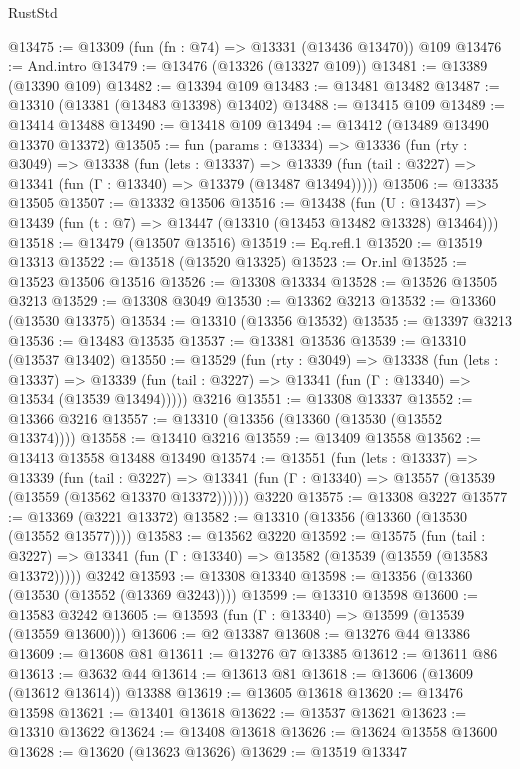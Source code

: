 \begin{lexlean}{RustStd}
\begin{coremodule}
@13475 := @13309 (fun (fn : @74) => @13331 (@13436 @13470)) @109
@13476 := And.intro
@13479 := @13476 (@13326 (@13327 @109))
@13481 := @13389 (@13390 @109)
@13482 := @13394 @109
@13483 := @13481 @13482
@13487 := @13310 (@13381 (@13483 @13398) @13402)
@13488 := @13415 @109
@13489 := @13414 @13488
@13490 := @13418 @109
@13494 := @13412 (@13489 @13490 @13370 @13372)
@13505 := fun (params : @13334) =>
  @13336
    (fun (rty : @3049) =>
    @13338
      (fun (lets : @13337) =>
      @13339 (fun (tail : @3227) => @13341 (fun (Γ : @13340) => @13379 (@13487 @13494)))))
@13506 := @13335 @13505
@13507 := @13332 @13506
@13516 := @13438
    (fun (U : @13437) => @13439 (fun (t : @7) => @13447 (@13310 (@13453 @13482 @13328) @13464)))
@13518 := @13479 (@13507 @13516)
@13519 := Eq.refl.{1}
@13520 := @13519 @13313
@13522 := @13518 (@13520 @13325)
@13523 := Or.inl
@13525 := @13523 @13506 @13516
@13526 := @13308 @13334
@13528 := @13526 @13505 @3213
@13529 := @13308 @3049
@13530 := @13362 @3213
@13532 := @13360 (@13530 @13375)
@13534 := @13310 (@13356 @13532)
@13535 := @13397 @3213
@13536 := @13483 @13535
@13537 := @13381 @13536
@13539 := @13310 (@13537 @13402)
@13550 := @13529
    (fun (rty : @3049) =>
    @13338
      (fun (lets : @13337) =>
      @13339 (fun (tail : @3227) => @13341 (fun (Γ : @13340) => @13534 (@13539 @13494)))))
    @3216
@13551 := @13308 @13337
@13552 := @13366 @3216
@13557 := @13310 (@13356 (@13360 (@13530 (@13552 @13374))))
@13558 := @13410 @3216
@13559 := @13409 @13558
@13562 := @13413 @13558 @13488 @13490
@13574 := @13551
    (fun (lets : @13337) =>
    @13339
      (fun (tail : @3227) =>
      @13341 (fun (Γ : @13340) => @13557 (@13539 (@13559 (@13562 @13370 @13372))))))
    @3220
@13575 := @13308 @3227
@13577 := @13369 (@3221 @13372)
@13582 := @13310 (@13356 (@13360 (@13530 (@13552 @13577))))
@13583 := @13562 @3220
@13592 := @13575
    (fun (tail : @3227) => @13341 (fun (Γ : @13340) => @13582 (@13539 (@13559 (@13583 @13372)))))
    @3242
@13593 := @13308 @13340
@13598 := @13356 (@13360 (@13530 (@13552 (@13369 @3243))))
@13599 := @13310 @13598
@13600 := @13583 @3242
@13605 := @13593 (fun (Γ : @13340) => @13599 (@13539 (@13559 @13600)))
@13606 := @2 @13387
@13608 := @13276 @44 @13386
@13609 := @13608 @81
@13611 := @13276 @7 @13385
@13612 := @13611 @86
@13613 := @3632 @44
@13614 := @13613 @81
@13618 := @13606 (@13609 (@13612 @13614)) @13388
@13619 := @13605 @13618
@13620 := @13476 @13598
@13621 := @13401 @13618
@13622 := @13537 @13621
@13623 := @13310 @13622
@13624 := @13408 @13618
@13626 := @13624 @13558 @13600
@13628 := @13620 (@13623 @13626)
@13629 := @13519 @13347

\end{coremodule}
\end{lexlean}
